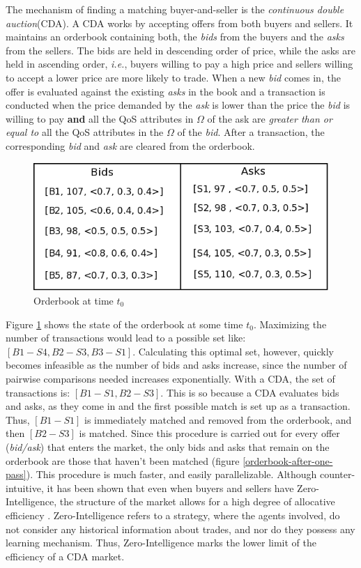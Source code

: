 \documentclass[10pt,journal,compsoc]{IEEEtran}
\begin{document}
The mechanism of finding a matching buyer-and-seller is the \textit{continuous double auction}(CDA). A CDA works by accepting offers from both buyers and sellers. It maintains an orderbook containing both, the \textsl{bids} from the buyers and the \textsl{asks} from the sellers. The bids are held in descending order of price, while the asks are held in ascending order, \textit{i.e.}, buyers willing to pay a high price and sellers willing to accept a lower price are more likely to trade. When a new \textit{bid} comes in, the offer is evaluated against the existing \textit{asks} in the book and a transaction is conducted when the price demanded by the \textit{ask} is lower than the price the \textit{bid} is willing to pay \textbf{and} all the QoS attributes in $\Omega$ of the ask are \textit{greater than or equal to} all the QoS attributes in the $\Omega$ of the \textit{bid}. After a transaction, the corresponding \textit{bid} and \textit{ask} are cleared from the orderbook.
\begin{figure}
\includegraphics[scale=0.31]{drawings/orderbook.png}
\caption{Orderbook at time $t_{0}$}
\label{orderbook}
\end{figure}
Figure \ref{orderbook} shows the state of the orderbook at some time \textit{$t_{0}$}. Maximizing the number of transactions would lead to a possible set like: $[B1-S4, B2-S3, B3-S1]$. Calculating this optimal set, however, quickly becomes infeasible as the number of bids and asks increase, since the number of pairwise comparisons needed increases exponentially.  With a CDA, the set of transactions is: $[B1-S1, B2-S3]$. This is so because a CDA evaluates bids and asks, as they come in and the first possible match is set up as a transaction. Thus, $[B1-S1]$ is immediately matched and removed from the orderbook, and then $[B2-S3]$ is matched.  Since this procedure is carried out for every offer (\textit{bid/ask}) that enters the market, the only bids and asks that remain on the orderbook are those that haven't been matched (figure \ref{orderbook-after-one-pass}). This procedure is much faster, and easily parallelizable. Although counter-intuitive, it has been shown that even when buyers and sellers have Zero-Intelligence, the structure of the market allows for a high degree of allocative efficiency \cite{Gode1993Allocative}. Zero-Intelligence refers to a strategy, where the agents involved, do not consider any historical information about trades, and nor do they possess any learning mechanism. Thus, Zero-Intelligence marks the lower limit of the efficiency of a CDA market.
\end{document}
